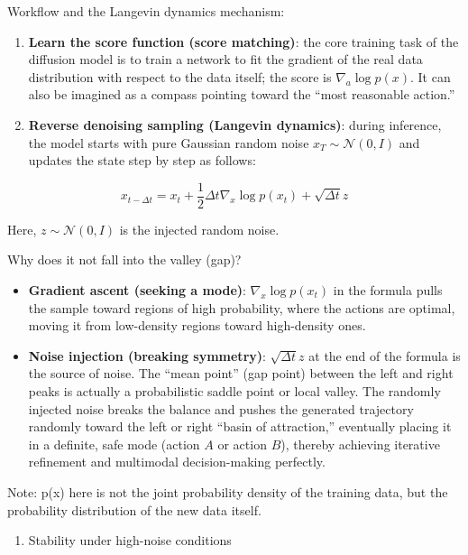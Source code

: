 Workflow and the Langevin dynamics mechanism:

\begin{enumerate}
\def\labelenumi{\arabic{enumi}.}
\tightlist
\item
  \textbf{Learn the score function (score matching)}: the core training task of the diffusion model is to train a network to fit the gradient of the real data distribution with respect to the data itself; the score is \(\nabla_a\log p(x)\). It can also be imagined as a compass pointing toward the ``most reasonable action.''
\item
{}
  \textbf{Reverse denoising sampling (Langevin dynamics)}: during inference, the model starts with pure Gaussian random noise \(x_T\sim\mathcal{N}(0,I)\) and updates the state step by step as follows:
\end{enumerate}

\[
x_{t-\Delta t}=x_t+\frac{1}{2}\Delta t\nabla_x\log p(x_t)+\sqrt{\Delta t}z
\]

Here, \(z\sim\mathcal{N}(0,I)\) is the injected random noise.

Why does it not fall into the valley (gap)?

\begin{itemize}
\tightlist
\item
  \textbf{Gradient ascent (seeking a mode)}: \(\nabla_x\log p(x_t)\) in the formula pulls the sample toward regions of high probability, where the actions are optimal, moving it from low-density regions toward high-density ones.
\item
  \textbf{Noise injection (breaking symmetry)}: \(\sqrt{\Delta t}z\) at the end of the formula is the source of noise. The ``mean point'' (gap point) between the left and right peaks is actually a probabilistic saddle point or local valley. The randomly injected noise breaks the balance and pushes the generated trajectory randomly toward the left or right ``basin of attraction,'' eventually placing it in a definite, safe mode (action \(A\) or action \(B\)), thereby achieving iterative refinement and multimodal decision-making perfectly.
\end{itemize}

Note: p(x) here is not the joint probability density of the training data, but the probability distribution of the new data itself.

\begin{enumerate}
\def\labelenumi{\arabic{enumi}.}
\setcounter{enumi}{2}
\tightlist
\item
  Stability under high-noise conditions
\end{enumerate}


